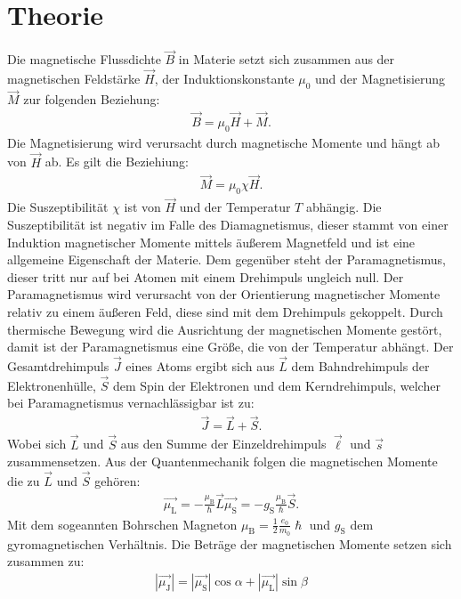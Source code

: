 \section{Theorie}
\label{sec:Theorie}
Die magnetische Flussdichte $\vec{B}$ in Materie setzt sich zusammen aus der magnetischen Feldstärke $\vec{H}$,
der Induktionskonstante $\mu_\mathrm{0}$ und der Magnetisierung $\vec{M}$ zur
folgenden Beziehung:
\begin{align}
  \vec{B}=\mu_\mathrm{0}\vec{H}+\vec{M}.
\end{align}
Die Magnetisierung wird verursacht durch magnetische Momente und hängt ab
von $\vec{H}$ ab. Es gilt die Beziehiung:
\begin{align}
  \vec{M}=\mu_\mathrm{0}\chi\vec{H}.
\end{align}
Die Suszeptibilität $\chi$ ist von $\vec{H}$ und der Temperatur $T$ abhängig.
Die Suszeptibilität ist negativ im Falle des Diamagnetismus,
dieser stammt von einer Induktion magnetischer Momente mittels äußerem
Magnetfeld und ist eine allgemeine Eigenschaft der Materie.
Dem gegenüber steht der Paramagnetismus, dieser tritt nur auf bei
Atomen mit einem Drehimpuls ungleich null. Der Paramagnetismus wird
verursacht von der Orientierung magnetischer Momente relativ
zu einem äußeren Feld, diese sind mit dem Drehimpuls gekoppelt.
Durch thermische Bewegung wird die Ausrichtung der magnetischen Momente
gestört, damit ist der Paramagnetismus eine Größe, die von der Temperatur
abhängt.
Der Gesamtdrehimpuls $\vec{J}$ eines Atoms ergibt sich aus
$\vec{L}$ dem Bahndrehimpuls der Elektronenhülle, $\vec{S}$ dem Spin
der Elektronen und dem Kerndrehimpuls, welcher bei Paramagnetismus
vernachlässigbar ist zu:
\begin{align}
  \vec{J}=\vec{L}+\vec{S}.
\end{align}
Wobei sich $\vec{L}$ und $\vec{S}$ aus den Summe der  Einzeldrehimpuls $\vec{\ell}$
und $\vec{s}$ zusammensetzen.
Aus der Quantenmechanik folgen die magnetischen Momente die zu $\vec{L}$ und $\vec{S}$
gehören:
\begin{align}
  \vec{\mu_\mathrm{L}}=-\frac{\mu_\mathrm{B}}{\hslash}\vec{L}
  \vec{\mu_\mathrm{S}}=-g_\mathrm{S}\frac{\mu_\mathrm{B}}{\hslash}\vec{S}.
\end{align}
Mit dem sogeannten Bohrschen Magneton $\mu_\mathrm{B}=\frac{1}{2}\frac{e_0}{m_0}\hslash$
und $g_\mathrm{S}$ dem gyromagnetischen Verhältnis.
Die Beträge der magnetischen Momente setzen sich zusammen zu:
\begin{align}
  |\vec{\mu_\mathrm{J}}|=|\vec{\mu_\mathrm{S}}|\cos{\alpha}+|\vec{\mu_\mathrm{L}}|\sin{\beta}
\end{align}
